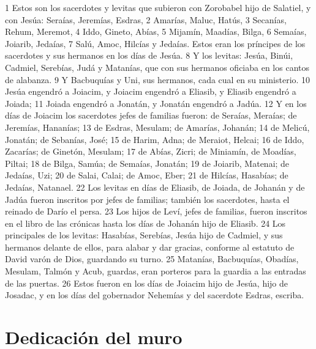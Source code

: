 1 Estos son los sacerdotes y levitas que subieron con Zorobabel hijo de Salatiel, y con Jesúa: Seraías, Jeremías, Esdras,
2 Amarías, Maluc, Hatús,
3 Secanías, Rehum, Meremot, 
4 Iddo, Gineto, Abías,
5 Mijamín, Maadías, Bilga,
6 Semaías, Joiarib, Jedaías,
7 Salú, Amoc, Hilcías y Jedaías. Estos eran los príncipes de los sacerdotes y sus hermanos en los días de Jesúa.
8 Y los levitas: Jesúa, Binúi, Cadmiel, Serebías, Judá y Matanías, que con sus hermanos oficiaba en los cantos de alabanza.
9 Y Bacbuquías y Uni, sus hermanos, cada cual en su ministerio.
10 Jesúa engendró a Joiacim, y Joiacim engendró a Eliasib, y Eliasib engendró a Joiada;
11 Joiada engendró a Jonatán, y Jonatán engendró a Jadúa.
12 Y en los días de Joiacim los sacerdotes jefes de familias fueron: de Seraías, Meraías; de Jeremías, Hananías;
13 de Esdras, Mesulam; de Amarías, Johanán;
14 de Melicú, Jonatán; de Sebanías, José;
15 de Harim, Adna; de Meraiot, Helcai;
16 de Iddo, Zacarías; de Ginetón, Mesulam;
17 de Abías, Zicri; de Miniamín, de Moadías, Piltai;
18 de Bilga, Samúa; de Semaías, Jonatán;
19 de Joiarib, Matenai; de Jedaías, Uzi;
20 de Salai, Calai; de Amoc, Eber;
21 de Hilcías, Hasabías; de Jedaías, Natanael.
22 Los levitas en días de Eliasib, de Joiada, de Johanán y de Jadúa fueron inscritos por jefes de familias; también los sacerdotes, hasta el reinado de Darío el persa.
23 Los hijos de Leví, jefes de familias, fueron inscritos en el libro de las crónicas hasta los días de Johanán hijo de Eliasib.
24 Los principales de los levitas: Hasabías, Serebías, Jesúa hijo de Cadmiel, y sus hermanos delante de ellos, para alabar y dar gracias, conforme al estatuto de David varón de Dios, guardando su turno.
25 Matanías, Bacbuquías, Obadías, Mesulam, Talmón y Acub, guardas, eran porteros para la guardia a las entradas de las puertas.
26 Estos fueron en los días de Joiacim hijo de Jesúa, hijo de Josadac, y en los días del gobernador Nehemías y del sacerdote Esdras, escriba.
\section*{Dedicación del muro}

